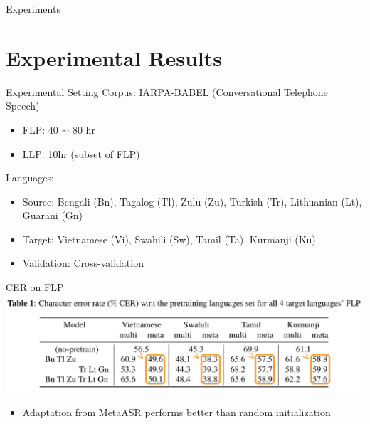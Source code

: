 \documentclass{beamer}
\begin{document}
\begin{frame}
	\begin{center}
    \LARGE{Experiments}
	\end{center}
\end{frame}

\section{Experimental Results}
\begin{frame}[t]{Experimental Setting}
  Corpus: IARPA-BABEL (Conversational Telephone Speech)
  \begin{itemize}
    \item FLP: 40 $\sim$ 80 hr
    \item LLP: 10hr (subset of FLP)
  \end{itemize}
  \pause
  Languages:
  \begin{itemize}
    \item Source: Bengali (Bn), Tagalog (Tl), Zulu (Zu), Turkish (Tr), Lithuanian (Lt), Guarani (Gn)
    \item Target: Vietnamese (Vi), Swahili (Sw), Tamil (Ta), Kurmanji (Ku)
    \item Validation: Cross-validation
  \end{itemize}
\end{frame}

\begin{frame}[t]{CER on FLP}
  \center \includegraphics[width=1.0\textwidth]{fig/flp_hl1.png}

  \begin{itemize}
    \item Adaptation from MetaASR performs better than random initialization
  \end{itemize}
\end{frame}
\end{document}
